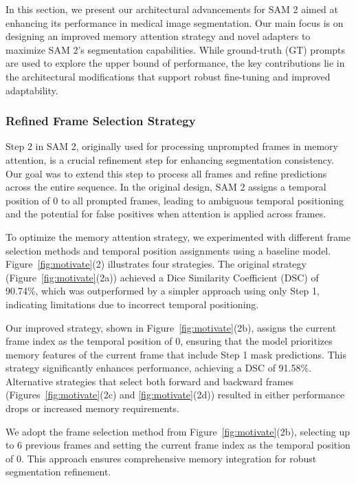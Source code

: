 In this section, we present our architectural advancements for SAM 2 aimed at enhancing its performance in medical image segmentation. Our main focus is on designing an improved memory attention strategy and novel adapters to maximize SAM 2's segmentation capabilities. While ground-truth (GT) prompts are used to explore the upper bound of performance, the key contributions lie in the architectural modifications that support robust fine-tuning and improved adaptability.


\subsubsection{Refined Frame Selection Strategy}
Step 2 in SAM 2, originally used for processing unprompted frames in memory attention, is a crucial refinement step for enhancing segmentation consistency. Our goal was to extend this step to process all frames and refine predictions across the entire sequence. In the original design, SAM 2 assigns a temporal position of 0 to all prompted frames, leading to ambiguous temporal positioning and the potential for false positives when attention is applied across frames.

To optimize the memory attention strategy, we experimented with different frame selection methods and temporal position assignments using a baseline model. Figure~\ref{fig:motivate}(2) illustrates four strategies. The original strategy (Figure~\ref{fig:motivate}(2a)) achieved a Dice Similarity Coefficient (DSC) of 90.74\%, which was outperformed by a simpler approach using only Step 1, indicating limitations due to incorrect temporal positioning.

Our improved strategy, shown in Figure~\ref{fig:motivate}(2b), assigns the current frame index as the temporal position of 0, ensuring that the model prioritizes memory features of the current frame that include Step 1 mask predictions. This strategy significantly enhances performance, achieving a DSC of 91.58\%. Alternative strategies that select both forward and backward frames (Figures~\ref{fig:motivate}(2c) and \ref{fig:motivate}(2d)) resulted in either performance drops or increased memory requirements.

We adopt the frame selection method from Figure~\ref{fig:motivate}(2b), selecting up to 6 previous frames and setting the current frame index as the temporal position of 0. This approach ensures comprehensive memory integration for robust segmentation refinement.


